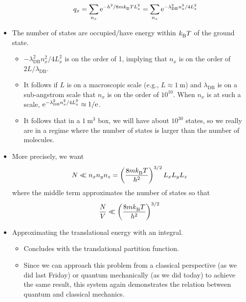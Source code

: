 \documentclass[../notes.tex]{subfiles}
\begin{document}
\begin{itemize}
\begin{itemize}
        \begin{equation*}
            q_x = \sum_{n_x}\e[-h^2/8m\kB TL_x^2]
            = \sum_{n_x}\e[-\lambda_\text{DB}^2n_x^2/4L_x^2]
        \end{equation*}
    \end{itemize}
    \item The number of states are occupied/have energy within $\kB T$ of the ground state.
    \begin{itemize}
        \item $-\lambda_\text{DB}^2n_x^2/4L_x^2$ is on the order of 1, implying that $n_x$ is on the order of $2L/\lambda_\text{DB}$.
        \item It follows if $L$ is on a macroscopic scale (e.g., $L\approx\SI{1}{\meter}$) and $\lambda_\text{DB}$ is on a sub-angstrom scale that $n_x$ is on the order of $10^{10}$. When $n_x$ is at such a scale, $\e[-\lambda_\text{DB}^2n_x^2/4L_x^2]\approx 1/\e$.
        \item It follows that in a $\SI{1}{\cubic\meter}$ box, we will have about $10^{30}$ states, so we really are in a regime where the number of states is larger than the number of molecules.
    \end{itemize}
    \item More precisely, we want
    \begin{equation*}
        N \ll n_xn_yn_z = \left( \frac{8m\kB T}{h^2} \right)^{3/2}L_xL_yL_z
    \end{equation*}
    where the middle term approximates the number of states so that
    \begin{equation*}
        \frac{N}{V} \ll \left( \frac{8m\kB T}{h^2} \right)^{3/2}
    \end{equation*}
    \item Approximating the translational energy with an integral.
    \begin{itemize}
        \item Concludes with the translational partition function.
        \item Since we can approach this problem from a classical perspective (as we did last Friday) or quantum mechanically (as we did today) to achieve the same result, this system again demonstrates the relation between quantum and classical mechanics.
    \end{itemize}
\end{itemize}
\end{document}
